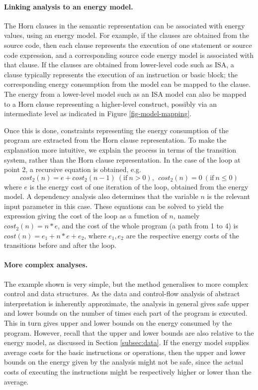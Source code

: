 \documentclass[oneside]{book}
\begin{document}
\paragraph{Linking analysis to an energy model.} The Horn clauses in the semantic
representation can be 
associated with energy values, using an energy model. For example, if the clauses are obtained
from the source code, then each clause represents the execution of one statement or
source code expression, and a corresponding source code energy model is associated with
that clause.
If the clauses are obtained from lower-level code such as ISA, a clause typically represents 
the execution of
an instruction or basic block;  the corresponding energy consumption from the model can be
mapped to the clause. The energy from a lower-level model
such as an ISA model can also be mapped to a Horn clause representing 
a higher-level construct, possibly via an intermediate level as indicated in Figure \ref{fig-model-mapping}. 

Once this is done, constraints
representing the energy consumption of the program are extracted from the Horn clause 
representation. To make the explanation more intuitive, we explain the process in terms of the transition system,
rather than the Horn clause representation. In the case of the loop at point 2, a recursive equation is obtained, e.g.
\[ cost_2(n) = e + cost_2(n-1)~ (\mathrm{if}~n > 0), ~~cost_2(n) = 0 ~ (\mathrm{if}~n \le 0) \]
where $e$ is the energy cost of one iteration of the loop, obtained from the energy model. A dependency analysis
also determines that the variable $n$ is the relevant input parameter in this case. These
equations can be solved to yield the expression giving the cost of the loop as a function of $n$, 
namely $cost_2(n) = n*e$, and the cost of the whole 
program (a path from 1 to 4) is $cost(n) = e_1 + n*e + e_2$, where $e_1, e_2$ are the respective
energy costs of the transitions before and after the loop.

\paragraph{More complex analyses.} The example shown is very simple, but the method generalises to
more complex control and data structures.  
As the data and control-flow analysis of abstract interpretation is inherently approximate, 
the analysis in general gives safe upper and lower bounds on the 
number of times each part of the program is executed. This in turn gives upper and lower bounds on the energy
consumed by the program.  However, recall that the upper and lower bounds are also relative to the energy model,
as discussed in Section \ref{subsec:data}. If the energy model supplies average costs for the basic instructions
or operations, then the upper and lower bounds on the energy given by the analysis might not be safe, since the
actual costs of executing the instructions might be respectively higher or lower than the average.
\end{document}
